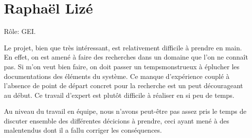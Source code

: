 \section{Raphaël Lizé}

Rôle: GEI.

Le projet, bien que très intéressant, est relativement difficile
à prendre en main. En effet, on est amené à faire des recherches
dans un domaine que l'on ne connaît pas. Si m'on veut bien faire,
on doit passer un tempsmonstrueux à éplucher les documentations
des éléments du système. Ce manque d'expérience couplé à l'absence
de point de départ concret pour la recherche est un peut décourageant
au début. Ce travail d'expert est plutôt difficile à réaliser en
si peu de temps.

Au niveau du travail en équipe, nous n'avons peut-être pas assez
pris le temps de discuter ensemble des différentes décicions à
prendre, ceci ayant mené à des malentendus dont il a fallu corriger
les conséquences.
